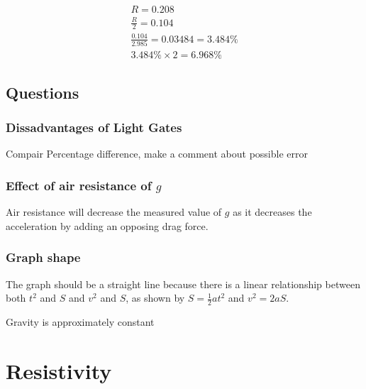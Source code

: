\documentclass{article}
\begin{document}
\begin{gather}
	R = 0.208 \\
	\frac{R}{2} = 0.104 \\
    \frac{0.104}{2.985} = 0.03484 = 3.484\% \\
	3.484 \% \times 2 = 6.968 \%
\end{gather}

\subsection{Questions}
\subsubsection{Dissadvantages of Light Gates}
Compair Percentage difference, make a comment about possible error

\subsubsection{Effect of air resistance of $g$}
Air resistance will decrease the measured value of $g$ as it decreases the acceleration
by adding an opposing drag force.

\subsubsection{Graph shape}
The graph should be a straight line because there is a linear relationship between both $t^2$ and $S$ and $v^2$ and $S$,
as shown by $S = \frac{1}{2}at^2$ and $v^2 = 2aS$.

Gravity is approximately constant

\begin{center}
\end{center}


\section{Resistivity}
\end{document}
